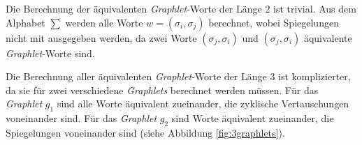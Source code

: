 \documentclass{report}
\begin{document}
Die Berechnung der \"aquivalenten \textit{Graphlet}-Worte der L\"ange 2 ist trivial. Aus dem Alphabet $\sum$ werden alle Worte $w = (\sigma_i, \sigma_j)$ berechnet, wobei Spiegelungen nicht mit ausgegeben werden, da zwei Worte $ (\sigma_j, \sigma_i) $ und $ (\sigma_j, \sigma_i) $ \"aquivalente \textit{Graphlet}-Worte sind.

Die Berechnung aller \"aquivalenten \textit{Graphlet}-Worte der L\"ange 3 ist komplizierter, da sie f\"ur zwei verschiedene \textit{Graphlets} berechnet werden m\"ussen. F\"ur das \textit{Graphlet} $g_1$ sind alle Worte \"aquivalent zueinander, die zyklische Vertauschungen voneinander sind. F\"ur das \textit{Graphlet} $g_2$ sind Worte \"aquivalent zueinander, die Spiegelungen voneinander sind (siehe Abbildung \ref{fig:3graphlets}).



%
%
\end{document}
